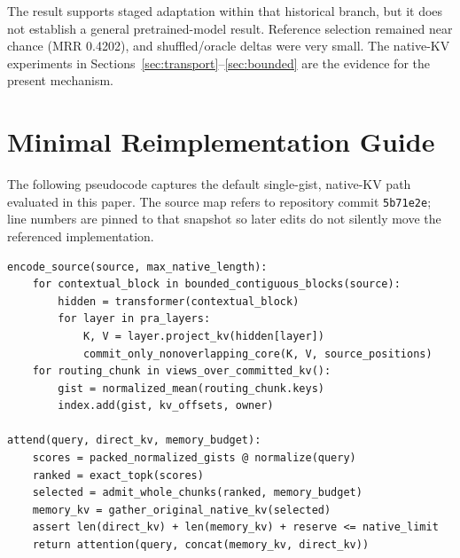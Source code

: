 \documentclass[11pt]{article}
\begin{document}
The result supports staged adaptation within that historical branch,
but it does not establish a general pretrained-model result.
Reference selection remained near chance (MRR 0.4202),
and shuffled/oracle deltas were very small. The native-KV experiments in
Sections~\ref{sec:transport}--\ref{sec:bounded} are the evidence for the present
mechanism.

\section{Minimal Reimplementation Guide}
\label{app:implementation}

The following pseudocode captures the default single-gist,
native-KV path evaluated in this paper. The source map refers to repository commit
\texttt{5b71e2e}; line numbers are pinned to that snapshot so later edits do not
silently move the referenced implementation.

\begin{verbatim}
encode_source(source, max_native_length):
    for contextual_block in bounded_contiguous_blocks(source):
        hidden = transformer(contextual_block)
        for layer in pra_layers:
            K, V = layer.project_kv(hidden[layer])
            commit_only_nonoverlapping_core(K, V, source_positions)
    for routing_chunk in views_over_committed_kv():
        gist = normalized_mean(routing_chunk.keys)
        index.add(gist, kv_offsets, owner)

attend(query, direct_kv, memory_budget):
    scores = packed_normalized_gists @ normalize(query)
    ranked = exact_topk(scores)
    selected = admit_whole_chunks(ranked, memory_budget)
    memory_kv = gather_original_native_kv(selected)
    assert len(direct_kv) + len(memory_kv) + reserve <= native_limit
    return attention(query, concat(memory_kv, direct_kv))
\end{verbatim}
\end{document}
